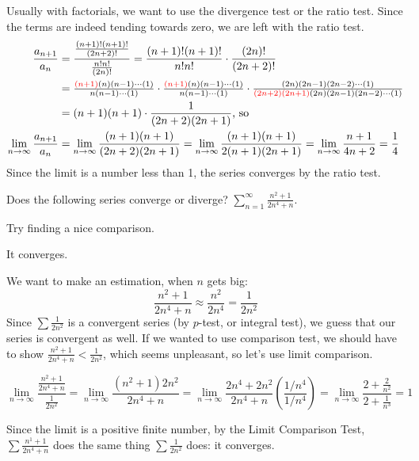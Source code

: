 \begin{solution}
Usually with factorials, we want to use the divergence test or the ratio test. Since the terms are indeed tending towards zero, we are left with the ratio test.
\begin{align*}
\frac{a_{n+1}}{a_n}&=\frac{\frac{(n+1)!(n+1)!}{(2n+2)!}}{\frac{n!n!}{(2n)!}}=\frac{(n+1)!(n+1)!}{n!n!}\cdot\frac{(2n)!}{(2n+2)!}\\
&=\tfrac{\textcolor{red}{(n+1)}{(n)}{(n-1)}\cdots{(1)}}{{n}{(n-1)}\cdots{(1)}}
\cdot\tfrac{\textcolor{red}{(n+1)}{(n)}{(n-1)}\cdots{(1)}}{{n}{(n-1)}\cdots{(1)}}
\cdot
\tfrac{{(2n)}{(2n-1)}{(2n-2)}\cdots{(1)}}{\textcolor{red}{(2n+2)(2n+1)}{(2n)}{(2n-1)}{(2n-2)}\cdots{(1)}}
\\
&=(n+1)(n+1) \cdot \frac{1}{(2n+2)(2n+1)}\mbox{, so}\\
\lim_{n \rightarrow \infty}\frac{a_{n+1}}{a_n}&=\lim_{n \rightarrow \infty}\frac{(n+1)(n+1)}{(2n+2)(2n+1)}
=\lim_{n \rightarrow \infty}\frac{(n+1)(n+1)}{2(n+1)(2n+1)}
=\lim_{n \rightarrow \infty}\frac{n+1}{4n+2}=\frac{1}{4}
\end{align*}
Since the limit is a number less than 1, the series converges by the ratio test.
\end{solution}












\begin{Mquestion}
Does the following series converge or diverge?
$\displaystyle\sum_{n=1}^\infty\frac{n^2+1}{2n^4+n}$.
\end{Mquestion}

\begin{hint}
Try finding a nice comparison.
\end{hint}

\begin{answer}
It converges.
\end{answer}

\begin{solution}
We want to make an estimation, when $n$ gets big:
\[\frac{n^2+1}{2n^4+n} \approx \frac{n^2}{2n^4}=\frac{1}{2n^2}\]
Since $\sum \frac{1}{2n^2}$ is a convergent series (by $p$-test, or integral test), we guess that our series is convergent as well. If we wanted to use comparison test, we should have to show $\frac{n^2+1}{2n^4+n}<\frac{1}{2n^2}$, which seems unpleasant, so let's use limit comparison.

\[\lim_{n \rightarrow \infty}\frac{\frac{n^2+1}{2n^4+n}}{\frac{1}{2n^2}}=\lim_{n \rightarrow \infty}\frac{(n^2+1)2n^2}{2n^4+n}
=\lim_{n \rightarrow \infty}\frac{2n^4+2n^2}{2n^4+n}\left(\frac{1/n^4}{1/n^4}\right)=\lim_{n \rightarrow \infty}\frac{2+\frac{2}{n^2}}{2+\frac{1}{n^3}}=1
\]

Since the limit is a positive finite number, by the Limit Comparison Test, $\sum \frac{n^1+1}{2n^4+n}$ does the same thing $\sum\frac{1}{2n^2}$ does: it converges.
\end{solution}


